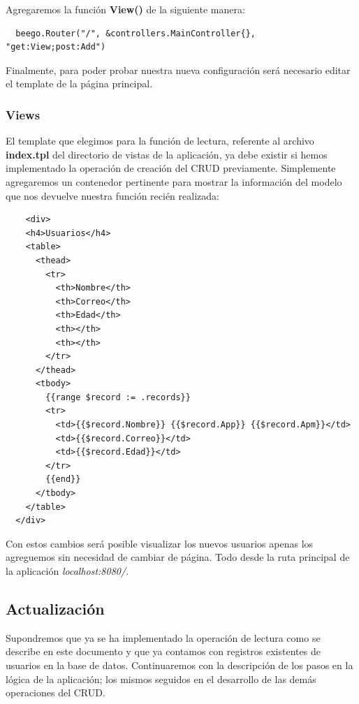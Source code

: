 \documentclass[12pt]{article}
\begin{document}
\noindent Agregaremos la función \textbf{View()} de la siguiente manera:
\begin{verbatim}
  beego.Router("/", &controllers.MainController{}, "get:View;post:Add")
\end{verbatim}
Finalmente, para poder probar nuestra nueva configuración será necesario editar el template de la página principal.
\subsubsection{Views}
El template que elegimos para la función de lectura, referente al archivo \textbf{index.tpl}
del directorio de vistas de la aplicación, ya debe existir si hemos implementado la operación
de creación del CRUD previamente. Simplemente agregaremos un contenedor pertinente para mostrar
la información del modelo que nos devuelve nuestra función recién realizada:
\begin{verbatim}
    <div>
    <h4>Usuarios</h4>
    <table>
      <thead>
        <tr>
          <th>Nombre</th>
          <th>Correo</th>
          <th>Edad</th>
          <th></th>
          <th></th>
        </tr>
      </thead>
      <tbody>
        {{range $record := .records}}
        <tr>
          <td>{{$record.Nombre}} {{$record.App}} {{$record.Apm}}</td>
          <td>{{$record.Correo}}</td>
          <td>{{$record.Edad}}</td>
        </tr>
        {{end}}
      </tbody>
    </table>
  </div>
\end{verbatim}
Con estos cambios será posible visualizar los nuevos usuarios apenas los agreguemos sin necesidad
de cambiar de página. Todo desde la ruta principal de la aplicación \textit{localhost:8080/}.
\subsection{Actualización}
Supondremos que ya se ha implementado la operación de lectura como se describe en este documento
y que ya contamos con registros existentes de usuarios en la base de datos.
Continuaremos con la descripción de los pasos en la lógica de la aplicación; los mismos
seguidos en el desarrollo de las demás operaciones del CRUD.
\end{document}
